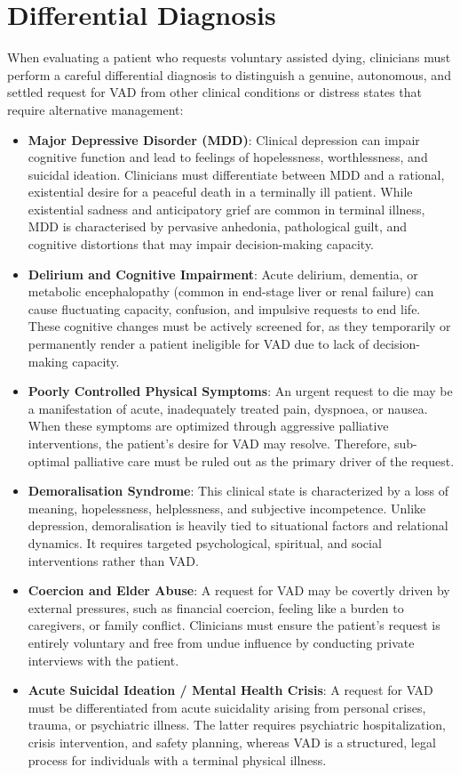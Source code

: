 \section*{Differential Diagnosis}
When evaluating a patient who requests voluntary assisted dying, clinicians must perform a careful differential diagnosis to distinguish a genuine, autonomous, and settled request for VAD from other clinical conditions or distress states that require alternative management:
\begin{itemize}
    \item \textbf{Major Depressive Disorder (MDD)}: Clinical depression can impair cognitive function and lead to feelings of hopelessness, worthlessness, and suicidal ideation. Clinicians must differentiate between MDD and a rational, existential desire for a peaceful death in a terminally ill patient. While existential sadness and anticipatory grief are common in terminal illness, MDD is characterised by pervasive anhedonia, pathological guilt, and cognitive distortions that may impair decision-making capacity.
    \item \textbf{Delirium and Cognitive Impairment}: Acute delirium, dementia, or metabolic encephalopathy (common in end-stage liver or renal failure) can cause fluctuating capacity, confusion, and impulsive requests to end life. These cognitive changes must be actively screened for, as they temporarily or permanently render a patient ineligible for VAD due to lack of decision-making capacity.
    \item \textbf{Poorly Controlled Physical Symptoms}: An urgent request to die may be a manifestation of acute, inadequately treated pain, dyspnoea, or nausea. When these symptoms are optimized through aggressive palliative interventions, the patient's desire for VAD may resolve. Therefore, sub-optimal palliative care must be ruled out as the primary driver of the request.
    \item \textbf{Demoralisation Syndrome}: This clinical state is characterized by a loss of meaning, hopelessness, helplessness, and subjective incompetence. Unlike depression, demoralisation is heavily tied to situational factors and relational dynamics. It requires targeted psychological, spiritual, and social interventions rather than VAD.
    \item \textbf{Coercion and Elder Abuse}: A request for VAD may be covertly driven by external pressures, such as financial coercion, feeling like a burden to caregivers, or family conflict. Clinicians must ensure the patient's request is entirely voluntary and free from undue influence by conducting private interviews with the patient.
    \item \textbf{Acute Suicidal Ideation / Mental Health Crisis}: A request for VAD must be differentiated from acute suicidality arising from personal crises, trauma, or psychiatric illness. The latter requires psychiatric hospitalization, crisis intervention, and safety planning, whereas VAD is a structured, legal process for individuals with a terminal physical illness.
\end{itemize}

